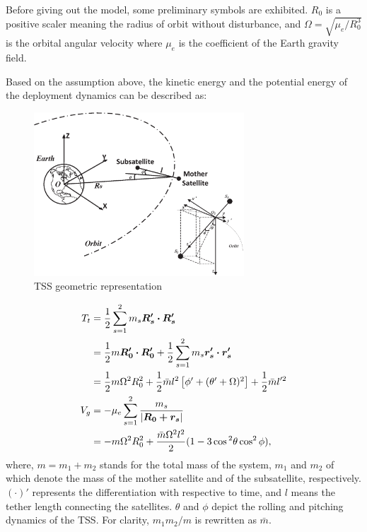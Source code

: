 \documentclass[Journal,letterpaper]{ascelike-new}
\theoremstyle{plain}
\theoremstyle{remark}
\begin{document}
Before giving out the model, some preliminary symbols are exhibited. $R_0$ is a positive scaler meaning the radius of orbit without disturbance, and $\Omega = \sqrt{\mu_e/R_0^3}$ is the orbital angular velocity where $\mu_e$ is the coefficient of the Earth gravity field.\par
Based on the assumption above, the kinetic energy and the potential energy of the deployment dynamics can be described as:
\begin{figure}[http]
\centering
\includegraphics[width=0.7\textwidth]{paper4_fig1.eps}
\caption{TSS geometric representation}
\label{fig:1}
\end{figure}
\begin{align}
T_t
&= \frac{1}{2}\sum\limits_{s=1}^2 m_s\bm{R_s'\cdot R_s'}\notag\\
&= \frac{1}{2}m\bm{R_0'\cdot R_0'}+\frac{1}{2}\sum\limits_{s=1}^2 m_s\bm{r_s'\cdot r_s'}\notag\\
&= \frac{1}{2}m\Omega^2R_0^2+\frac{1}{2}\bar{m}l^2\begin{bmatrix}\phi'+(\theta'+\Omega)^2\end{bmatrix}+\frac{1}{2}\bar{m}l'^2\label{eq:Tt1}\\
V_g
&= -\mu_e\sum\limits_{s=1}^2\frac{m_s}{\vert \bm{R_0+r_s}\vert}\notag\\
&= -m\Omega^2R_0^2+\frac{\bar{m}\Omega^2l^2}{2}(1-3\cos{^2\theta}\cos^2\phi),\label{eq:Vg}
\end{align}
where, $m = m_1+m_2$ stands for the total mass of the system, $m_1$ and $m_2$ of which denote the mass of the mother satellite and of the subsatellite, respectively. $(\cdot)'$ represents the differentiation with respective to time, and $l$ means the tether length connecting the satellites. $\theta$ and $\phi$ depict the rolling and pitching dynamics of the TSS. For clarity, $m_1m_2/m$ is rewritten as $\bar m$.
\end{document}
